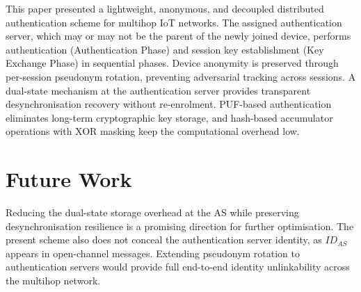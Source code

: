 \documentclass[conference]{IEEEtran}
\begin{document}
This paper presented a lightweight, anonymous, and decoupled distributed
authentication scheme for multihop IoT networks.  The assigned
authentication server, which may or may not be the parent of the newly joined
device, performs authentication (Authentication Phase) and session key
establishment (Key Exchange Phase) in sequential phases.  Device anonymity is preserved
through per-session pseudonym rotation, preventing adversarial tracking across
sessions.  A dual-state mechanism at the authentication server provides transparent
desynchronisation recovery without re-enrolment.
PUF-based authentication eliminates long-term cryptographic key storage, and
hash-based accumulator operations with XOR masking keep the computational
overhead low.


\section{Future Work}

Reducing the dual-state storage overhead at the AS while preserving
desynchronisation resilience is a promising direction for further optimisation.
The present scheme also does not conceal the authentication server identity,
as $\mathit{ID}_{AS}$ appears in open-channel messages.
Extending pseudonym rotation to authentication servers would provide full
end-to-end identity unlinkability across the multihop network.



\end{document}
